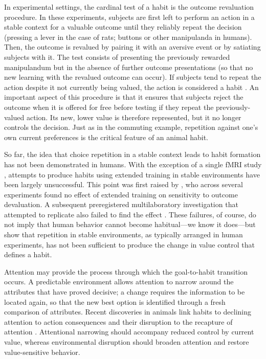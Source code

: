 \documentclass[man,natbib,floatsintext]{apa7}
\begin{document}
In experimental settings, the cardinal test of a habit is the outcome revaluation procedure. In these experiments, subjects are first left to perform an action in a stable context for a valuable outcome until they reliably repeat the decision (pressing a lever in the case of rats; buttons or other manipulanda in humans). Then, the outcome is revalued by pairing it with an aversive event or by satiating subjects with it. The test consists of presenting the previously rewarded manipulandum but in the absence of further outcome presentations (so that no new learning with the revalued outcome can occur). If subjects tend to repeat the action despite it not currently being valued, the action is considered a habit \citep{adamsDickinson1981,dickinson1985,perezDickinson2020}. An important aspect of this procedure is that it ensures that subjects reject the outcome when it is offered for free before testing if they repeat the previously-valued action. Its new, lower value is therefore represented, but it no longer controls the decision. Just as in the commuting example, repetition against one's own current preferences is the critical feature of an animal habit.   

So far, the idea that choice repetition in a stable context leads to habit formation has not been demonstrated in humans. With the exception of a single fMRI study \citep{tricomi2009}, attempts to produce habits using extended training in stable environments have been largely unsuccessful.  This point was first raised by  \cite{deWit2018}, who across  several experiments found no effect of extended training on sensitivity to outcome devaluation. A subsequent preregistered multilaboratory investigation that attempted to replicate \citet{tricomi2009} also failed to find the effect \citep{pool2022}. These failures, of course, do not imply that human behavior cannot become habitual---we know it does---but show that repetition in stable environments, as typically arranged in human experiments, has not been sufficient to produce the change in value control that defines a habit.

Attention may provide the process through which the goal-to-habit transition occurs. A predictable environment allows attention to narrow around the attributes that have proved decisive; a change requires the information to be located again, so that the new best option is identified through a fresh comparison of attributes. Recent discoveries in animals link habits to declining attention to action consequences and their disruption to the recapture of attention \citep{thrailkill2018,bouton2020,bouton2024}. Attentional narrowing should accompany reduced control by current value, whereas environmental disruption should broaden attention and restore value-sensitive behavior.
\end{document}
